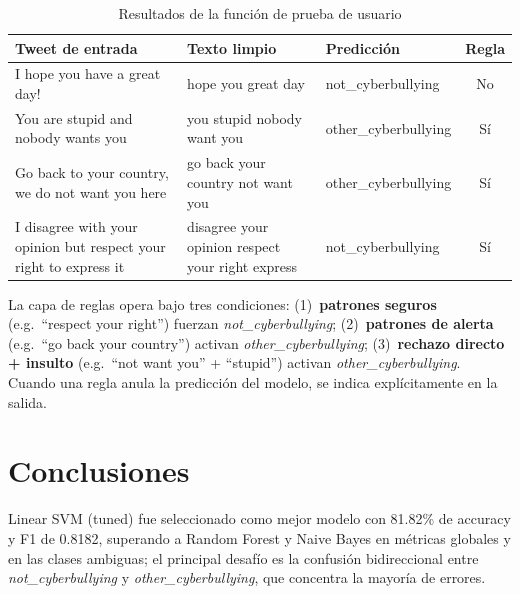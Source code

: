 ﻿\documentclass[12pt,a4paper]{article}
\begin{document}
\begin{table}[H]
\centering
\caption{Resultados de la función de prueba de usuario}
\label{tab:user_tests}
\begin{tabular}{p{5.8cm} p{3.5cm} p{2.8cm} c}
\toprule
Tweet de entrada & Texto limpio & Predicción & Regla \\
\midrule
I hope you have a great day!
  & hope you great day
  & not\_cyberbullying & No \\
\addlinespace
You are stupid and nobody wants you
  & you stupid nobody want you
  & other\_cyberbullying & Sí \\
\addlinespace
Go back to your country, we do not want you here
  & go back your country not want you
  & other\_cyberbullying & Sí \\
\addlinespace
I disagree with your opinion but respect your right to express it
  & disagree your opinion respect your right express
  & not\_cyberbullying & Sí \\
\bottomrule
\end{tabular}
\end{table}

La capa de reglas opera bajo tres condiciones:
(1)~\textbf{patrones seguros} (e.g.\ ``respect your right'') fuerzan
\textit{not\_cyberbullying};
(2)~\textbf{patrones de alerta} (e.g.\ ``go back your country'') activan
\textit{other\_cyberbullying};
(3)~\textbf{rechazo directo + insulto} (e.g.\ ``not want you'' + ``stupid'')
activan \textit{other\_cyberbullying}.
Cuando una regla anula la predicción del modelo, se indica explícitamente
en la salida.

\section{Conclusiones}

Linear SVM (tuned) fue seleccionado como mejor modelo con 81.82\% de
accuracy y F1 de 0.8182, superando a Random Forest y Naive Bayes en
métricas globales y en las clases ambiguas; el principal desafío es la
confusión bidireccional entre \textit{not\_cyberbullying} y
\textit{other\_cyberbullying}, que concentra la mayoría de errores.
\end{document}
